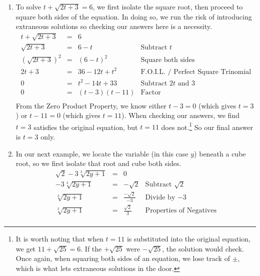 \documentclass{ximera}
\begin{document}
\begin{example}
\begin{explanation}
\begin{enumerate}
\item  To solve  $t + \sqrt{2t+3} = 6$, we first isolate the square root, then proceed to square both sides of the equation.  In doing so, we run the risk of introducing extraneous solutions so checking our answers here is a necessity. \[ \begin{array}{rclr}

t + \sqrt{2t+3}  & = & 6 & \\  

\sqrt{2t+3} & = & 6 - t & \text{Subtract $t$} \\  

(\sqrt{2t+3})^2 & = & (6-t)^2 & \text{Square both sides} \\  

2t + 3 & = & 36-12t + t^2 & \text{F.O.I.L. / Perfect Square Trinomial} \\  

0 & = & t^2 - 14t + 33 & \text{Subtract $2t$ and $3$} \\  

0 & = & (t-3)(t-11) & \text{Factor} \\ \end{array} \] From the Zero Product Property, we know either $t - 3 = 0$ (which gives $t=3$) or $t-11 = 0$ (which gives $t=11$).  When checking our answers, we find $t = 3$ satisfies the original equation, but $t = 11$ does not.\footnote{It is worth noting that when $t=11$ is substituted into the original equation, we get $11 + \sqrt{25} = 6$.  If the $+\sqrt{25}$ were $-\sqrt{25}$, the solution would check. Once again, when squaring both sides of an equation, we lose track of $\pm$, which is what lets extraneous solutions in the door.}  So our final answer is $t = 3$ only.

\item  In our next example, we locate the variable (in this case $y$) beneath a cube root, so we first isolate that root and cube both sides. \[ \begin{array}{rclr}


\sqrt{2} - 3\sqrt[3]{2y+1} &  = &  0 & \\ 

- 3\sqrt[3]{2y+1} &  = &  - \sqrt{2} & \text{Subtract $\sqrt{2}$} \\ 

\sqrt[3]{2y+1} & = & \frac{-\sqrt{2}}{-3} & \text{Divide by $-3$} \\ 

\sqrt[3]{2y+1} & = & \frac{\sqrt{2}}{3}  & \text{Properties of Negatives} \\ 


\end{array}\]
\end{enumerate}
\end{explanation}
\end{example}
\end{document}
